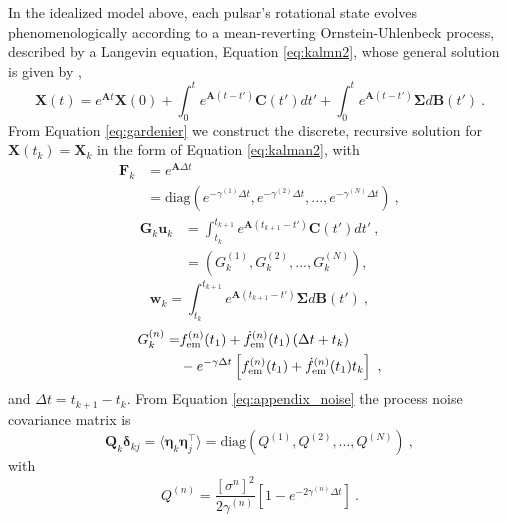 \documentclass[fleqn,usenatbib,useAMS]{mnras}
\begin{document}
In the idealized model above, each pulsar's rotational state evolves phenomenologically according to a mean-reverting Ornstein-Uhlenbeck process, described by a Langevin equation, Equation \eqref{eq:kalmn2}, whose general solution is given by \citep{gardiner2009stochastic},
\begin{equation}
	\boldsymbol{X}(t) = e^{\boldsymbol{A} t} \boldsymbol{X}(0) + \int_0^t e^{\boldsymbol{A}(t-t')} \boldsymbol{C}(t') dt' + \int_0^t e^{\boldsymbol{A}(t-t')} \boldsymbol{\Sigma} d\boldsymbol{B}(t') \ . \label{eq:gardenier}
\end{equation} 
From Equation \eqref{eq:gardenier} we construct the discrete, recursive solution for $\boldsymbol{X}(t_k) = \boldsymbol{X}_k$ in the form of Equation \eqref{eq:kalman2}, with
\begin{align}
	\boldsymbol{F}_k &= e^{\boldsymbol{A} \Delta t } \  \\
	&= \text{diag}\left(e^{- \gamma^{(1)} \Delta t},e^{- \gamma^{(2)} \Delta t},...,e^{- \gamma^{(N)} \Delta t} \right) \ ,
\end{align}
\begin{align}
	\boldsymbol{G}_k \boldsymbol{u}_k &= \int_{t_k}^{t_{k+1}}  e^{\boldsymbol{A}\left( t_{k+1} - t' \right)}  \boldsymbol{C}(t') dt' \ , \\
	&= \left(G^{(1)}_k, G^{(2)}_k,...,G^{(N)}_k \right) ,
\end{align}
\begin{equation}
	\boldsymbol{w}_k = \int_{t_k}^{t_{k+1}} e^{\boldsymbol{A}\left( t_{k+1} - t' \right)} \boldsymbol{\Sigma} d \boldsymbol{B}(t') \ ,  \label{eq:appendix_noise}
\end{equation}
\begin{align}
	G_k^{(n)} =&    f^{(n)}_{\rm em}(t_1) + \dot{f}^{(n)}_{\rm em}(t_1)  \left(\Delta t + t_k \right) \nonumber \\ 
	&- e^{-\gamma \Delta t} \left[  f^{(n)}_{\rm em}(t_1) +\dot{f}^{(n)}_{\rm em}(t_1)  t_k \right] \ ,
\end{align}
and $\Delta t = t_{k+1} - t_k$. From Equation \eqref{eq:appendix_noise} the process noise covariance matrix is
\begin{equation}
	\boldsymbol{Q}_k \boldsymbol{\delta}_{kj}= \langle \boldsymbol{\eta}_k \boldsymbol{\eta}_j^\intercal \rangle = \text{diag} \left(Q^{(1)}, Q^{(2)},...,Q^{(N)}\right) \ ,
\end{equation}
with 
\begin{equation}
	Q^{(n)} = \frac{[\sigma^{n}]^2}{2 \gamma^{(n)}} \left[ 1 - e^{-2 \gamma^{(n)} \Delta t}\right] \ .
\end{equation}
\end{document}
